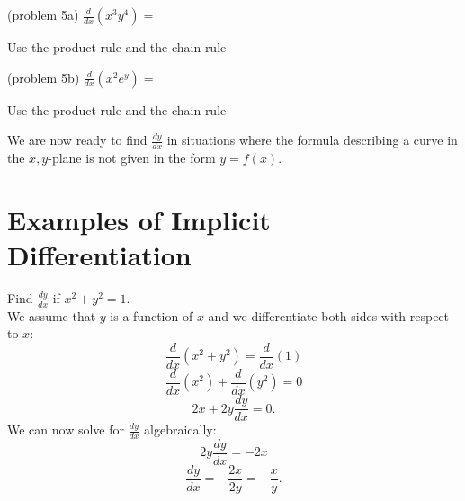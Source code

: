 \documentclass{ximera}
\begin{document}
\begin{center}
\begin{foldable}
\end{foldable}
\end{center}

\begin{problem}(problem 5a)
  $\displaystyle{\frac{d}{dx} \left(x^3y^4\right)=}$
 
\begin{multipleChoice}
\end{multipleChoice}
	     
		\begin{hint}
      Use the product rule and the chain rule
    \end{hint}
 	
\end{problem}


\begin{problem}(problem 5b)
  $\displaystyle{\frac{d}{dx} \left(x^2e^y\right)=}$
 
\begin{multipleChoice}
\end{multipleChoice}
	     
		\begin{hint}
      Use the product rule and the chain rule
    \end{hint}
 	
\end{problem}






We are now ready to find $\frac{dy}{dx}$ in situations where the formula describing a curve in the $x,y$-plane 
is not given in the form $y = f(x)$.

\section{Examples of Implicit Differentiation}


\begin{example}[example 6]
Find $\displaystyle{\frac{dy}{dx}}$ if $x^2 + y^2 = 1$.\\
We assume that $y$ is a 
function of $x$ and we differentiate both 
sides with respect to $x$:
\[\frac{d}{dx}(x^2 + y^2)  = \frac{d}{dx} (1) \]
\[\frac{d}{dx}(x^2) + \frac{d}{dx} (y^2) = 0\]
\[2x + 2y\frac{dy}{dx} = 0.\]
We can now solve for $\displaystyle{\frac{dy}{dx}}$ algebraically:
\[2y\frac{dy}{dx} = -2x\]
\[\frac{dy}{dx} = -\frac{2x}{2y}= -\frac{x}{y}.\]
\end{example}
\end{document}
